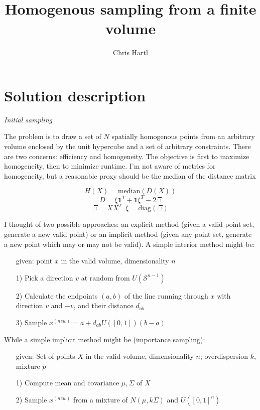 \documentclass{article}
\title{Homogenous sampling from a finite volume}
\author{Chris Hartl}
\begin{document}
\maketitle

\section*{Solution description}

\textit{Initial sampling}

The problem is to draw a set of $N$ spatially homogenous points from an arbitrary volume enclosed by the unit hypercube and a set of arbitrary constraints.  There are two concerns: efficiency and homogeneity. The objective is first to maximize homogeneity, then to minimize runtime. I'm not aware of metrics for homogeneity, but a reasonable proxy should be the median of the distance matrix

$$H(X) = \mathrm{median}(D(X))$$
$$D = \xi \mathbf{1}^T + \mathbf{1}\xi^T - 2\Xi$$
$$\Xi = XX^T \;\; \xi = \mathrm{diag}(\Xi)$$

I thought of two possible approaches: an explicit method (given a valid point set, generate a new valid point) or an implicit method (given any point set, generate a new point which may or may not be valid). A simple interior method might be:

\begin{itemize}
\item[given:] point $x$ in the valid volume, dimensionality $n$
\item[1)] Pick a direction $v$ at random from $U(\mathcal{S}^{n-1})$
\item[2)] Calculate the endpoints $(a, b)$ of the line running through $x$ with direction $v$ and $-v$, and their distance $d_{ab}$
\item[3)] Sample $x^{(new)} = a + d_{ab}U([0, 1])(b-a)$
\end{itemize}

While a simple implicit method might be (importance sampling):
\begin{itemize}
\item[given:] Set of points $X$ in the valid volume, dimensionality $n$; overdispersion $k$, mixture $p$
\item[1)] Compute mean and covariance $\mu, \Sigma$ of $X$
\item[2)] Sample $x^{(new)}$ from a mixture of $N(\mu, k\Sigma)$ and $U([0,1]^n)$
\end{itemize}
\end{document}
